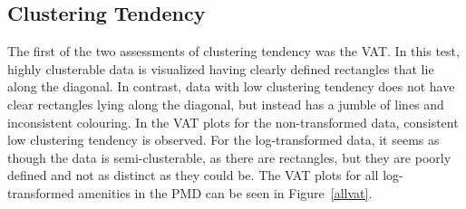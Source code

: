 \documentclass[11pt, a4paper]{article}
\begin{document}
\begin{table}[h]
\centering
\caption[Number of outliers]{The effect of outliers in each amenity in the PMD before and after log-transformation.}\label{outliercounts}
\end{table}









\subsection{Clustering Tendency}


The first of the two assessments of clustering tendency was the VAT. In this test, highly clusterable data is visualized having clearly defined rectangles that lie along the diagonal. In contrast, data with low clustering tendency does not have clear rectangles lying along the diagonal, but instead has a jumble of lines and inconsistent colouring. In the VAT plots for the non-transformed data, consistent low clustering tendency is observed. For the log-transformed data, it seems as though the data is semi-clusterable, as there are rectangles, but they are poorly defined and not as distinct as they could be. The VAT plots for all log-transformed amenities in the PMD can be seen in Figure~\ref{allvat}.
\end{document}
